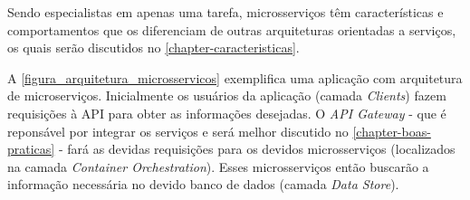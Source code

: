 Sendo especialistas em apenas uma tarefa, microsserviços têm características e comportamentos que os diferenciam de outras arquiteturas orientadas a serviços, os quais serão discutidos no \autoref{chapter-caracteristicas}.

A \autoref{figura_arquitetura_microsservicos} exemplifica uma aplicação com arquitetura de microserviços. Inicialmente os usuários da aplicação (camada \emph{Clients}) fazem requisições à API para obter as informações desejadas. O \emph{API Gateway} - que é reponsável por integrar os serviços e será melhor discutido no \autoref{chapter-boas-praticas} - fará as devidas requisições para os devidos microsserviços (localizados na camada \emph{Container Orchestration}). Esses microsserviços então buscarão a informação necessária no devido banco de dados (camada \emph{Data Store}).




